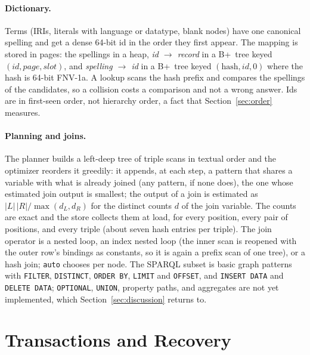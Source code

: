 \documentclass[sigconf, nonacm]{acmart}
\begin{document}
\paragraph{Dictionary.} Terms (IRIs, literals with language or datatype, blank nodes) have one canonical spelling and get a dense 64-bit id in the order they first appear. The mapping is stored in pages: the spellings in a heap, \emph{id $\to$ record} in a B+~tree keyed $(\mathit{id}, \mathit{page}, \mathit{slot})$, and \emph{spelling $\to$ id} in a B+~tree keyed $(\text{hash}, \mathit{id}, 0)$ where the hash is 64-bit FNV-1a. A lookup scans the hash prefix and compares the spellings of the candidates, so a collision costs a comparison and not a wrong answer. Ids are in first-seen order, not hierarchy order, a fact that Section~\ref{sec:order} measures.

\paragraph{Planning and joins.} The planner builds a left-deep tree of triple scans in textual order and the optimizer reorders it greedily: it appends, at each step, a pattern that shares a variable with what is already joined (any pattern, if none does), the one whose estimated join output is smallest; the output of a join is estimated as $|L|\,|R|/\max(d_L,d_R)$ for the distinct counts $d$ of the join variable. The counts are exact and the store collects them at load, for every position, every pair of positions, and every triple (about seven hash entries per triple). The join operator is a nested loop, an index nested loop (the inner scan is reopened with the outer row's bindings as constants, so it is again a prefix scan of one tree), or a hash join; \texttt{auto} chooses per node. The SPARQL subset is basic graph patterns with \texttt{FILTER}, \texttt{DISTINCT}, \texttt{ORDER BY}, \texttt{LIMIT} and \texttt{OFFSET}, and \texttt{INSERT DATA} and \texttt{DELETE DATA}; \texttt{OPTIONAL}, \texttt{UNION}, property paths, and aggregates are not yet implemented, which Section~\ref{sec:discussion} returns to.

\section{Transactions and Recovery}
\label{sec:recovery}
\end{document}
